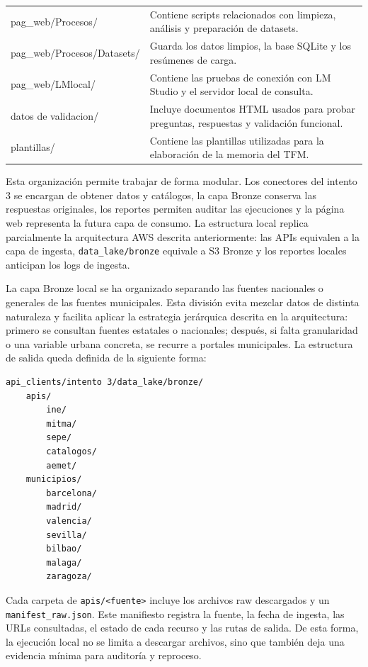 \begin{longtable}{>{\raggedright\arraybackslash}p{} >{\raggedright\arraybackslash}p{}}
pag\_web/Procesos/ & Contiene scripts relacionados con limpieza, análisis y preparación de datasets. \\
pag\_web/Procesos/Datasets/ & Guarda los datos limpios, la base SQLite y los resúmenes de carga. \\
pag\_web/LMlocal/ & Contiene las pruebas de conexión con LM Studio y el servidor local de consulta. \\
datos de validacion/ & Incluye documentos HTML usados para probar preguntas, respuestas y validación funcional. \\
plantillas/ & Contiene las plantillas utilizadas para la elaboración de la memoria del TFM. \\
\bottomrule
\end{longtable}

Esta organización permite trabajar de forma modular. Los conectores del intento 3 se encargan de obtener datos y catálogos, la capa Bronze conserva las respuestas originales, los reportes permiten auditar las ejecuciones y la página web representa la futura capa de consumo. La estructura local replica parcialmente la arquitectura AWS descrita anteriormente: las APIs equivalen a la capa de ingesta, \texttt{data\_lake/bronze} equivale a S3 Bronze y los reportes locales anticipan los logs de ingesta.

La capa Bronze local se ha organizado separando las fuentes nacionales o generales de las fuentes municipales. Esta división evita mezclar datos de distinta naturaleza y facilita aplicar la estrategia jerárquica descrita en la arquitectura: primero se consultan fuentes estatales o nacionales; después, si falta granularidad o una variable urbana concreta, se recurre a portales municipales. La estructura de salida queda definida de la siguiente forma:

\begin{verbatim}
api_clients/intento 3/data_lake/bronze/
	apis/
		ine/
		mitma/
		sepe/
		catalogos/
		aemet/
	municipios/
		barcelona/
		madrid/
		valencia/
		sevilla/
		bilbao/
		malaga/
		zaragoza/
\end{verbatim}

Cada carpeta de \texttt{apis/<fuente>} incluye los archivos raw descargados y un \texttt{manifest\_raw.json}. Este manifiesto registra la fuente, la fecha de ingesta, las URLs consultadas, el estado de cada recurso y las rutas de salida. De esta forma, la ejecución local no se limita a descargar archivos, sino que también deja una evidencia mínima para auditoría y reproceso.

